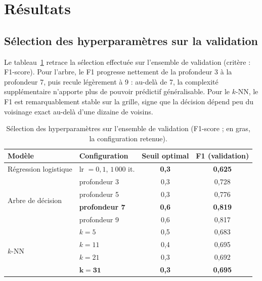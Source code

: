 
\section{Résultats}
\label{sec:resultats}


\subsection{Sélection des hyperparamètres sur la validation}

Le tableau~\ref{tab:validation} retrace la sélection effectuée sur l'ensemble
de validation (critère : F1-score). Pour l'arbre, le F1 progresse nettement de
la profondeur 3 à la profondeur 7, puis recule légèrement à 9 : au-delà de 7,
la complexité supplémentaire n'apporte plus de pouvoir prédictif généralisable.
Pour le $k$-NN, le F1 est remarquablement stable sur la grille, signe que la
décision dépend peu du voisinage exact au-delà d'une dizaine de voisins.

\begin{table}[H]
  \centering
  \caption{Sélection des hyperparamètres sur l'ensemble de validation
    (F1-score ; en gras, la configuration retenue).}
  \label{tab:validation}
  \begin{tabular}{llcc}
    \toprule
    \textbf{Modèle} & \textbf{Configuration} & \textbf{Seuil optimal} & \textbf{F1 (validation)} \\
    \midrule
    Régression logistique & lr $=0{,}1$, $1\,000$ it. & \textbf{0,3} & \textbf{0,625} \\
    \midrule
    \multirow{4}{*}{Arbre de décision}
      & profondeur 3 & 0,3 & 0,728 \\
      & profondeur 5 & 0,3 & 0,776 \\
      & \textbf{profondeur 7} & \textbf{0,6} & \textbf{0,819} \\
      & profondeur 9 & 0,6 & 0,817 \\
    \midrule
    \multirow{4}{*}{$k$-NN}
      & $k = 5$  & 0,5 & 0,683 \\
      & $k = 11$ & 0,4 & 0,695 \\
      & $k = 21$ & 0,3 & 0,692 \\
      & $\boldsymbol{k = 31}$ & \textbf{0,3} & \textbf{0,695} \\
    \bottomrule
  \end{tabular}
\end{table}

